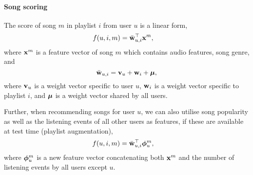 


\paragraph{Song scoring}

The score of song $m$ in playlist $i$ from user $u$ is a linear form,
\begin{equation*}
\begin{aligned}
f(u, i, m) &= \bar{\mathbf{w}}_{u,i}^\top \mathbf{x}^m,
\end{aligned}
\end{equation*}
where $\mathbf{x}^m$ is a feature vector of song $m$ which contains audio features, song genre, and 
\begin{equation*}
\bar{\mathbf{w}}_{u,i} = \mathbf{v}_u + \mathbf{w}_i + \bm{\mu},
\end{equation*}
where $\mathbf{v}_u$ is a weight vector specific to user $u$,
$\mathbf{w}_i$ is a weight vector specific to playlist $i$,
and $\bm{\mu}$ is a weight vector shared by all users.

Further, when recommending songs for user $u$, we can also utilise song popularity as well as the listening events of all other users as features,
if these are available at test time (\eg playlist augmentation), \ie
\begin{equation*}
\begin{aligned}
f(u, i, m) &= \bar{\mathbf{w}}_{u,i}^\top \bm{\phi}_u^m,
\end{aligned}
\end{equation*}
where $\bm{\phi}_u^m$ is a new feature vector concatenating both $\mathbf{x}^m$ and the number of listening events by all users except $u$.
